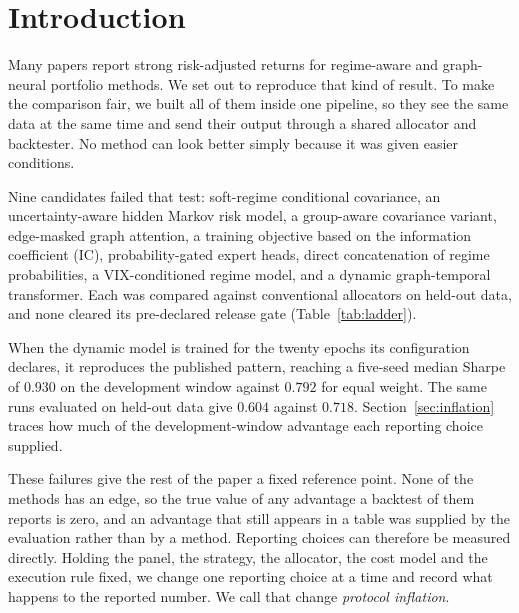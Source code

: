 \documentclass[sigconf,nonacm]{acmart}
\begin{document}


{\setlength{\emergencystretch}{3em}\maketitle}

\section{Introduction}

Many papers report strong risk-adjusted returns for regime-aware and
graph-neural portfolio methods. We set out to reproduce that kind of result. To
make the comparison fair, we built all of them inside one pipeline, so they see
the same data at the same time and send their output through a shared allocator
and backtester. No method can look better simply because
it was given easier conditions.

Nine candidates failed that test: soft-regime conditional covariance, an
uncertainty-aware hidden Markov risk model, a group-aware covariance variant,
edge-masked graph attention, a training objective based on the information
coefficient (IC),
probability-gated expert heads, direct concatenation of regime probabilities, a
VIX-conditioned regime model, and a dynamic graph-temporal transformer. Each was
compared against conventional allocators on held-out data, and none cleared its
pre-declared release gate (Table~\ref{tab:ladder}).

When the dynamic model is trained for the twenty epochs its configuration
declares, it reproduces the published pattern, reaching a five-seed median
Sharpe of $0.930$ on the development window against $0.792$ for equal weight.
The same runs evaluated on held-out data give $0.604$ against $0.718$.
Section~\ref{sec:inflation} traces how much of the development-window advantage
each reporting choice supplied.

These failures give the rest of the paper a fixed reference point. None of the
methods has an edge, so the true value of any advantage a backtest of them
reports is zero, and an advantage that still appears in a table was supplied by
the evaluation rather than by a method. Reporting choices can therefore be
measured directly. Holding the panel, the strategy, the allocator, the cost
model and the execution rule fixed, we change one reporting choice at a time and
record what happens to the reported number. We call that change \emph{protocol
inflation}.
\end{document}

